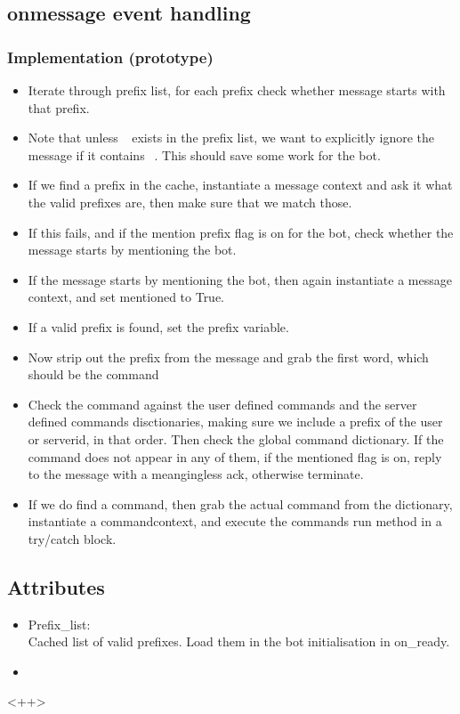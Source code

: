 \documentclass[a4paper]{amsart}
\begin{document}
\subsection{onmessage event handling}
    \subsubsection{Implementation (prototype)}
        \begin{itemize}
            \item Iterate through prefix list, for each prefix check whether message starts with that prefix.
            \item Note that unless $~~$ exists in the prefix list, we want to explicitly ignore the message if it contains $~~$. This should save some work for the bot.
            \item If we find a prefix in the cache, instantiate a message context and ask it what the valid prefixes are, then make sure that we match those.
            \item If this fails, and if the mention prefix flag is on for the bot, check whether the message starts by mentioning the bot.
            \item If the message starts by mentioning the bot, then again instantiate a message context, and set mentioned to True.
            \item If a valid prefix is found, set the prefix variable.
            \item Now strip out the prefix from the message and grab the first word, which should be the command
            \item Check the command against the user defined commands and the server defined commands disctionaries, making sure we include a prefix of the user or serverid, in that order. Then check the global command dictionary. If the command does not appear in any of them, if the mentioned flag is on, reply to the message with a meangingless ack, otherwise terminate.
            \item If we do find a command, then grab the actual command from the dictionary, instantiate a commandcontext, and execute the commands run method in a try/catch block.
        \end{itemize}
\subsection{Attributes}
    \begin{itemize}
        \item Prefix\_list:\\
            Cached list of valid prefixes. Load them in the bot initialisation in on\_ready.
        \item 
    \end{itemize}<++>
\end{document}

